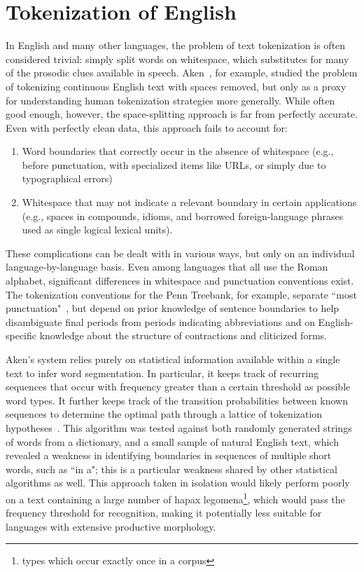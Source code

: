 \section{Tokenization of English}
In English and many other languages, the problem of text tokenization is often considered trivial: simply split words on whitespace, which substitutes for many of the prosodic clues available in speech. Aken~\cite{aken11}, for example, studied the problem of tokenizing continuous English text with spaces removed, but only as a proxy for understanding human tokenization strategies more generally. While often good enough, however, the space-splitting approach is far from perfectly accurate. Even with perfectly clean data, this approach fails to account for:
\begin{enumerate}
	\item Word boundaries that correctly occur in the absence of whitespace (e.g., before punctuation, with specialized items like URLs, or simply due to typographical errors)
	\item Whitespace that may not indicate a relevant boundary in certain applications (e.g., spaces in compounds, idioms, and borrowed foreign-language phrases used as single logical lexical units).
\end{enumerate}
These complications can be dealt with in various ways, but only on an individual language-by-language basis. Even among languages that all use the Roman alphabet, significant differences in whitespace and punctuation conventions exist. The tokenization conventions for the Penn Treebank, for example, separate ``most punctuation"~\cite{treebank}, but depend on prior knowledge of sentence boundaries to help disambiguate final periods from periods indicating abbreviations and on English-specific knowledge about the structure of contractions and cliticized forms.

Aken's system relies purely on statistical information available within a single text to infer word segmentation. In particular, it keeps track of recurring sequences that occur with frequency greater than a certain threshold as possible word types. It further keeps track of the transition probabilities between known sequences to determine the optimal path through a lattice of tokenization hypotheses~\cite{aken11}. This algorithm was tested against both randomly generated strings of words from a dictionary, and a small sample of natural English text, which revealed a weakness in identifying boundaries in sequences of multiple short words, such as ``in a"; this is a particular weakness shared by other statistical algorithms as well. This approach taken in isolation would likely perform poorly on a text containing a large number of hapax legomena\footnote{types which occur exactly once in a corpus}, which would pass the frequency threshold for recognition, making it potentially less suitable for languages with extensive productive morphology.

